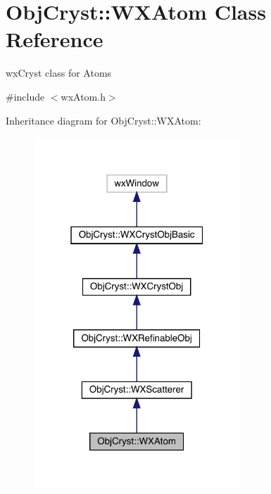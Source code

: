 \hypertarget{class_obj_cryst_1_1_w_x_atom}{}\section{Obj\+Cryst\+::W\+X\+Atom Class Reference}
\label{class_obj_cryst_1_1_w_x_atom}


wx\+Cryst class for Atoms  




{\ttfamily \#include $<$wx\+Atom.\+h$>$}



Inheritance diagram for Obj\+Cryst\+::W\+X\+Atom\+:
\nopagebreak
\begin{figure}[H]
\begin{center}
\leavevmode
\includegraphics[width=220pt]{class_obj_cryst_1_1_w_x_atom__inherit__graph}
\end{center}
\end{figure}


